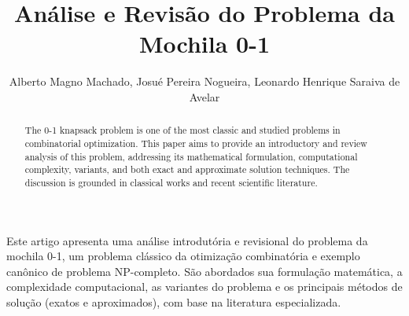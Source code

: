 \documentclass[12pt]{article}
\title{Análise e Revisão do Problema da Mochila 0-1}
\author{Alberto Magno Machado\inst{1}, Josué Pereira Nogueira\inst{1}, Leonardo Henrique Saraiva de Avelar\inst{1}}
\begin{document}
\maketitle

\begin{abstract}
    The 0-1 knapsack problem is one of the most classic and studied problems in combinatorial optimization. This paper aims to provide an introductory and review analysis of this problem, addressing its mathematical formulation, computational complexity, variants, and both exact and approximate solution techniques. The discussion is grounded in classical works and recent scientific literature.
\end{abstract}
     
\begin{resumo} 
Este artigo apresenta uma análise introdutória e revisional do problema da mochila 0-1, um problema clássico da otimização combinatória e exemplo canônico de problema NP-completo. São abordados sua formulação matemática, a complexidade computacional, as variantes do problema e os principais métodos de solução (exatos e aproximados), com base na literatura especializada.
\end{resumo}






\end{document}
